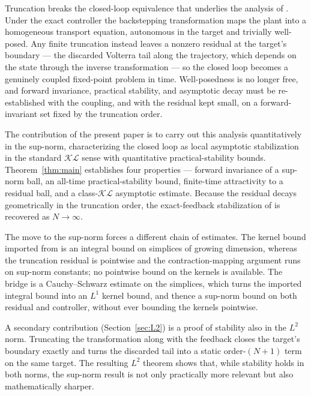 \documentclass[amsthm]{autart}
\theoremstyle{plain}
\theoremstyle{definition}
\newcommand{\Ltwo}{L^2}
\begin{document}
Truncation breaks the closed-loop equivalence that underlies the analysis of \cite{krstic2026feedbacklinearizationhyperbolicpdes}. Under the exact controller the backstepping transformation maps the plant into a homogeneous transport equation, autonomous in the target and trivially well-posed. Any finite truncation instead leaves a nonzero residual at the target's boundary --- the discarded Volterra tail along the trajectory, which depends on the state through the inverse transformation --- so the closed loop becomes a genuinely coupled fixed-point problem in time. Well-posedness is no longer free, and forward invariance, practical stability, and asymptotic decay must be re-established with the coupling, and with the residual kept small, on a forward-invariant set fixed by the truncation order.

The contribution of the present paper is to carry out this analysis quantitatively in the sup-norm, characterizing the closed loop as local asymptotic stabilization in the standard $\mathcal{KL}$ sense with quantitative practical-stability bounds. Theorem~\ref{thm:main} establishes four properties --- forward invariance of a sup-norm ball, an all-time practical-stability bound, finite-time attractivity to a residual ball, and a class-$\mathcal{KL}$ asymptotic estimate. Because the residual decays geometrically in the truncation order, the exact-feedback stabilization of \cite{krstic2026feedbacklinearizationhyperbolicpdes} is recovered as $N \to \infty$.

The move to the sup-norm forces a different chain of estimates. The kernel bound imported from \cite{krstic2026feedbacklinearizationhyperbolicpdes} is an integral bound on simplices of growing dimension, whereas the truncation residual is pointwise and the contraction-mapping argument runs on sup-norm constants; no pointwise bound on the kernels is available. The bridge is a Cauchy--Schwarz estimate on the simplices, which turns the imported integral bound into an $L^1$ kernel bound, and thence a sup-norm bound on both residual and controller, without ever bounding the kernels pointwise.

A secondary contribution (Section~\ref{sec:L2}) is a proof of stability also in the $\Ltwo$ norm. Truncating the transformation along with the feedback closes the target's boundary exactly and turns the discarded tail into a static order-$(N{+}1)$ term on the same target. The resulting $\Ltwo$ theorem shows that, while stability holds in both norms, the sup-norm result is not only practically more relevant but also mathematically sharper.
\end{document}
